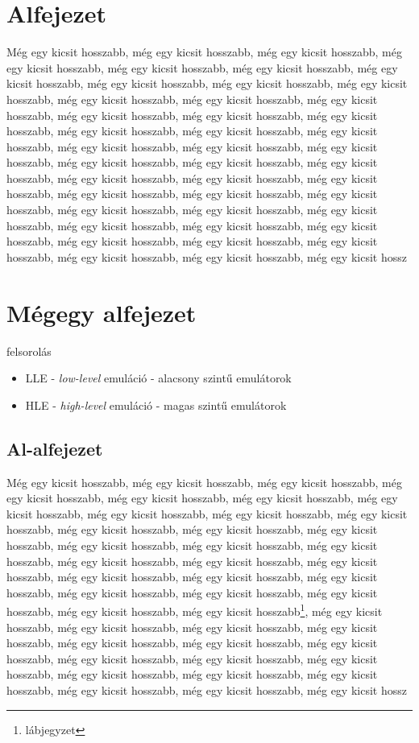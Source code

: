 \documentclass[a4paper,oneside,onecolumn,12pt]{LegrandOrangeBook}
\begin{document}
\section{Alfejezet}

Még egy kicsit hosszabb, még egy kicsit hosszabb, még egy kicsit hosszabb, még egy kicsit hosszabb, még egy kicsit hosszabb, még egy kicsit hosszabb, még egy kicsit hosszabb, még egy kicsit hosszabb, még egy kicsit hosszabb, még egy kicsit hosszabb, még egy kicsit hosszabb, még egy kicsit hosszabb, még egy kicsit hosszabb, még egy kicsit hosszabb, még egy kicsit hosszabb, még egy kicsit hosszabb, még egy kicsit hosszabb, még egy kicsit hosszabb, még egy kicsit hosszabb, még egy kicsit hosszabb, még egy kicsit hosszabb, még egy kicsit hosszabb, még egy kicsit hosszabb, még egy kicsit hosszabb, még egy kicsit hosszabb, még egy kicsit hosszabb, még egy kicsit hosszabb, még egy kicsit hosszabb, még egy kicsit hosszabb, még egy kicsit hosszabb, még egy kicsit hosszabb, még egy kicsit hosszabb, még egy kicsit hosszabb, még egy kicsit hosszabb, még egy kicsit hosszabb, még egy kicsit hosszabb, még egy kicsit hosszabb, még egy kicsit hosszabb, még egy kicsit hosszabb, még egy kicsit hosszabb, még egy kicsit hosszabb, még egy kicsit hosszabb, még egy kicsit hossz

\section{Mégegy alfejezet}

felsorolás

\begin{itemize}
    \item LLE - {\it low-level} emuláció - alacsony szintű emulátorok %
    \item HLE - {\it high-level} emuláció - magas szintű emulátorok %
\end{itemize}


\subsection{Al-alfejezet}

Még egy kicsit hosszabb, még egy kicsit hosszabb, még egy kicsit hosszabb, még egy kicsit hosszabb, még egy kicsit hosszabb, még egy kicsit hosszabb, még egy kicsit hosszabb, még egy kicsit hosszabb, még egy kicsit hosszabb, még egy kicsit hosszabb, még egy kicsit hosszabb, még egy kicsit hosszabb, még egy kicsit hosszabb, még egy kicsit hosszabb, még egy kicsit hosszabb, még egy kicsit hosszabb, még egy kicsit hosszabb, még egy kicsit hosszabb, még egy kicsit hosszabb, még egy kicsit hosszabb, még egy kicsit hosszabb, még egy kicsit hosszabb, még egy kicsit hosszabb, még egy kicsit hosszabb, még egy kicsit hosszabb, még egy kicsit hosszabb, még egy kicsit hosszabb\footnote{lábjegyzet}, még egy kicsit hosszabb, még egy kicsit hosszabb, még egy kicsit hosszabb, még egy kicsit hosszabb, még egy kicsit hosszabb, még egy kicsit hosszabb, még egy kicsit hosszabb, még egy kicsit hosszabb, még egy kicsit hosszabb, még egy kicsit hosszabb, még egy kicsit hosszabb, még egy kicsit hosszabb, még egy kicsit hosszabb, még egy kicsit hosszabb, még egy kicsit hosszabb, még egy kicsit hossz
\end{document}
